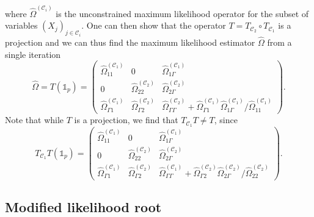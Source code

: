 where $\hat\Omega^{(\mathcal{C}_i)}$ is the unconstrained maximum likelihood operator for the subset of variables $(X_j)_{j \in \mathcal{C}_i}$. One can then show that the operator $T = T_{\mathcal{C}_2} \circ T_{\mathcal{C}_1}$ is a projection and we can thus find the maximum likelihood estimator $\hat\Omega$ from a single iteration
\begin{equation*}
    \hat\Omega = T(\mathbb{1}_p) = \left(\begin{matrix}
        \hat\Omega^{(\mathcal{C}_1)}_{11} & 0 & \hat\Omega^{(\mathcal{C}_1)}_{1 \Gamma} \\
        0 & \hat\Omega^{(\mathcal{C}_2)}_{22} &  \hat\Omega^{(\mathcal{C}_2)}_{2 \Gamma} \\
        \hat\Omega^{(\mathcal{C}_1)}_{\Gamma 1} & \hat\Omega^{(\mathcal{C}_2)}_{\Gamma 2} & \hat\Omega^{(\mathcal{C}_2)}_{\Gamma \Gamma} + \hat\Omega^{(\mathcal{C}_1)}_{\Gamma 1}\hat\Omega^{(\mathcal{C}_1)}_{1 \Gamma} /\hat\Omega^{(\mathcal{C}_1)}_{11}
    \end{matrix}\right).
\end{equation*}
Note that while $T$ is a projection, we find that $T_{\mathcal{C}_1}T \neq T$, since 
\begin{equation*}
    T_{\mathcal{C}_1}T(\mathbb{1}_p) = \left(\begin{matrix}
        \hat\Omega^{(\mathcal{C}_1)}_{11} & 0 & \hat\Omega^{(\mathcal{C}_1)}_{1 \Gamma} \\
        0 & \hat\Omega^{(\mathcal{C}_2)}_{22} &  \hat\Omega^{(\mathcal{C}_2)}_{2 \Gamma} \\
        \hat\Omega^{(\mathcal{C}_1)}_{\Gamma 1} & \hat\Omega^{(\mathcal{C}_2)}_{\Gamma 2} & \hat\Omega^{(\mathcal{C}_1)}_{\Gamma \Gamma} +  \hat\Omega^{(\mathcal{C}_2)}_{\Gamma 2}\hat\Omega^{(\mathcal{C}_2)}_{2 \Gamma} /\hat\Omega^{(\mathcal{C}_2)}_{22}
    \end{matrix}\right).
\end{equation*}


\subsection{Modified likelihood root}

